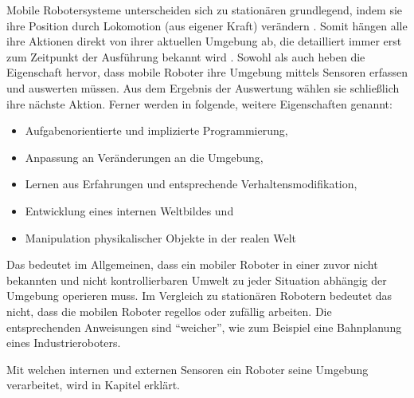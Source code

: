 Mobile Robotersysteme unterscheiden sich zu stationären grundlegend, indem sie ihre Position durch Lokomotion (aus eigener Kraft) verändern \cite{Haun2007}. Somit hängen alle ihre Aktionen direkt von ihrer aktuellen Umgebung ab, die detailliert immer erst zum Zeitpunkt der Ausführung bekannt wird \cite{hertzberg2009mobile}. Sowohl \cite{hertzberg2009mobile} als auch \cite{Haun2007} heben die Eigenschaft hervor, dass mobile Roboter ihre Umgebung mittels Sensoren erfassen und auswerten müssen. Aus dem Ergebnis der Auswertung wählen sie schließlich ihre nächste Aktion. Ferner werden in \cite{Haun2007} folgende, weitere Eigenschaften genannt:
\begin{itemize}
\item Aufgabenorientierte und implizierte Programmierung,
\item Anpassung an Veränderungen an die Umgebung,
\item Lernen aus Erfahrungen und entsprechende Verhaltensmodifikation,
\item Entwicklung eines internen Weltbildes und
\item Manipulation physikalischer Objekte in der realen Welt
\end{itemize}
Das bedeutet im Allgemeinen, dass ein mobiler Roboter in einer zuvor nicht bekannten und nicht kontrollierbaren Umwelt zu jeder Situation abhängig der Umgebung operieren muss. Im Vergleich zu stationären Robotern bedeutet das nicht, dass die mobilen Roboter regellos oder zufällig arbeiten. Die entsprechenden Anweisungen sind "`weicher"', wie zum Beispiel eine Bahnplanung eines Industrieroboters.

Mit welchen internen und externen Sensoren ein Roboter seine Umgebung verarbeitet, wird in Kapitel  erklärt.


